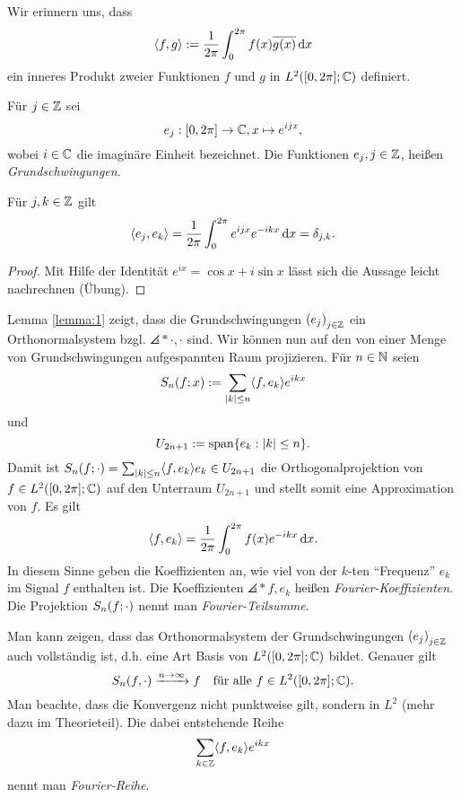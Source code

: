 \documentclass{lecture}
\begin{document}
    Wir erinnern uns, dass
    \[\angles*{f, g} := \frac{1}{2\pi}\int_0^{2\pi}f\parentheses*{x}\overline{g\parentheses*{x}}\d x\]
    ein inneres Produkt zweier Funktionen \(f\) und \(g\) in \(L^2\parentheses*{\brackets*{0, 2\pi}; \C}\) definiert.
    \begin{definition}
        Für \(j \in \Z\) sei
        \[
            e_j: \brackets*{0, 2\pi} \to \C, x \mapsto e^{ijx},
        \]
        wobei \(i \in \C\) die imaginäre Einheit bezeichnet.
        Die Funktionen \(e_j, j \in \Z\), heißen \emph{Grundschwingungen}.
    \end{definition}
    \begin{lemma}\label{lemma:1}
        Für \(j, k \in \Z\) gilt
        \[
            \angles*{e_j, e_k} = \frac{1}{2\pi}\int_0^{2\pi}e^{ijx}e^{-ikx}\d x = \delta_{j, k}.
        \]
    \end{lemma}
    \begin{proof}
        Mit Hilfe der Identität \(e^{ix} = \cos x + i \sin x\) lässt sich die Aussage leicht nachrechnen (Übung).
    \end{proof}
    \begin{remark}
        Lemma \ref{lemma:1} zeigt, dass die Grundschwingungen \(\parentheses*{e_j}_{j \in \Z}\) ein Orthonormalsystem bzgl. \(\angles*{\cdot, \cdot}\) sind.
        Wir können nun auf den von einer Menge von Grundschwingungen aufgespannten Raum projizieren.
        Für \(n \in \N\) seien
        \[
            S_n\parentheses*{f; x} := \sum_{\absolute*{k} \le n}\angles*{f, e_k}e^{ikx}
        \]
        und
        \[
            U_{2n + 1} := \setspan\braces*{e_k : \absolute*{k} \le n}.
        \]
        Damit ist \(S_n\parentheses*{f; \cdot} = \sum_{\absolute*{k} \le n}\angles*{f, e_k}e_k \in U_{2n + 1}\) die Orthogonalprojektion von \(f \in L^2\parentheses*{\brackets*{0, 2\pi}; \C}\) auf den Unterraum \(U_{2n + 1}\) und stellt somit eine Approximation von \(f\).
        Es gilt
        \[
            \angles*{f, e_k} = \frac{1}{2\pi}\int_0^{2\pi}f\parentheses*{x}e^{-ikx}\d x.
        \]
        In diesem Sinne geben die Koeffizienten an, wie viel von der \(k\)-ten ``Frequenz'' \(e_k\) im Signal \(f\) enthalten ist.
        Die Koeffizienten \(\angles*{f, e_k}\) heißen \emph{Fourier-Koeffizienten}.
        Die Projektion \(S_n\parentheses*{f; \cdot}\) nennt man \emph{Fourier-Teilsumme}.
    \end{remark}
    \begin{remark}
        Man kann zeigen, dass das Orthonormalsystem der Grundschwingungen \(\parentheses*{e_j}_{j \in \Z}\) auch vollständig ist, d.h. eine Art Basis von \(L^2\parentheses*{\brackets*{0, 2\pi}; \C}\) bildet.
        Genauer gilt
        \[
            S_n\parentheses*{f, \cdot} \xrightarrow{n \to \infty} f \quad \text{für alle }f \in L^2\parentheses*{\brackets*{0, 2\pi}; \C}.
        \]
        Man beachte, dass die Konvergenz nicht punktweise gilt, sondern in \(L^2\) (mehr dazu im Theorieteil).
        Die dabei entstehende Reihe
        \[
            \sum_{k \in \Z}\angles*{f, e_k}e^{ikx}
        \]
        nennt man \emph{Fourier-Reihe}.
    \end{remark}
\end{document}
